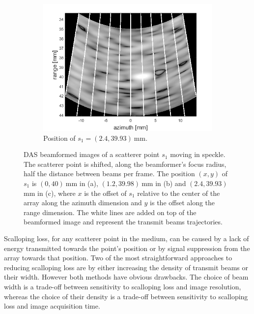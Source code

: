 \begin{figure}[ht]
\begin{subfigure}[t]{0.48\linewidth}
        \includegraphics[width=\linewidth]{./images/others/scallop_loss3.png}
        \caption{Position of $s_1 = (2.4, 39.93)~$mm.}
        \label{fig:bf_im3}
    \end{subfigure}
    \caption[DAS beamformed images of a scatterer point $s_1$ moving in speckle.]{DAS beamformed images of a scatterer point $s_1$ moving in speckle. The scatterer point is shifted, along the beamformer's focus radius, half the distance between beams per frame. The position $(x, y)$ of $s_1$ is $(0, 40)~$mm in (a), $(1.2, 39.98)~$mm in (b) and $(2.4, 39.93)~$mm in (c), where $x$ is the offset of $s_1$ relative to the center of the array along the azimuth dimension and $y$ is the offset along the range dimension. The white lines are added on top of the beamformed image and represent the transmit beams trajectories.}
	\label{fig:bf_im}
\end{figure}

Scalloping loss, for any scatterer point in the medium, can be caused by a lack of energy transmitted towards the point's position or by signal suppression from the array towards that position.
Two of the most straightforward approaches to reducing scalloping loss are by either increasing the density of transmit beams or their width. However both methods have obvious drawbacks. The choice of beam width is a trade-off between sensitivity to scalloping loss and image resolution, whereas the choice of their density is a trade-off between sensitivity to scalloping loss and image acquisition time.

